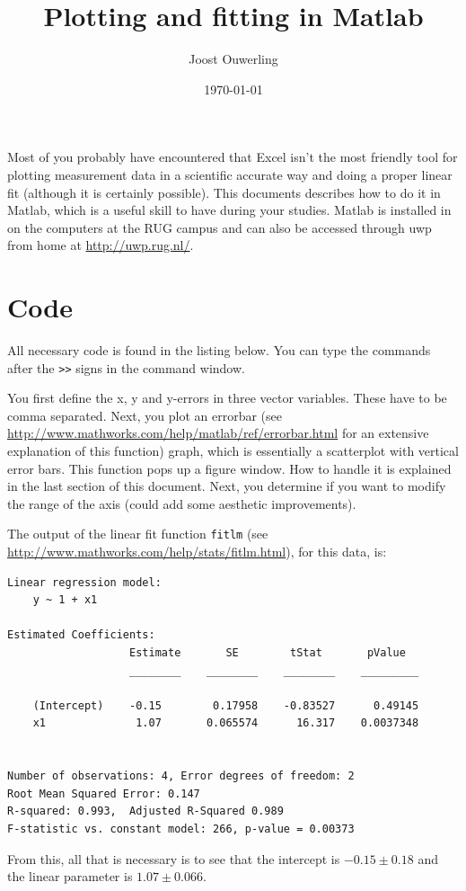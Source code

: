 \documentclass[a4paper]{article}
\title{Plotting and fitting in Matlab}
\author{Joost Ouwerling}
\date{\today}
\begin{document}
\maketitle

Most of you probably have encountered that Excel isn't the most friendly tool for plotting measurement data in a scientific accurate way and doing a proper linear fit (although it is certainly possible). This documents describes how to do it in Matlab, which is a useful skill to have during your studies. Matlab is installed in on the computers at the RUG campus and can also be accessed through uwp from home at \url{http://uwp.rug.nl/}. 


\section*{Code}

All necessary code is found in the listing below. You can type the commands after the \texttt{>>} signs in the command window.

You first define the x, y and y-errors in three vector variables. These have to be comma separated. Next, you plot an errorbar (see \url{http://www.mathworks.com/help/matlab/ref/errorbar.html} for an extensive explanation of this function) graph, which is essentially a scatterplot with vertical error bars. This function pops up a figure window. How to handle it is explained in the last section of this document. Next, you determine if you want to modify the range of the axis (could add some aesthetic improvements). 

\clearpage
The output of the linear fit function \texttt{fitlm} (see \url{http://www.mathworks.com/help/stats/fitlm.html}), for this data, is:
\begin{verbatim}
Linear regression model:
    y ~ 1 + x1

Estimated Coefficients:
                   Estimate       SE        tStat       pValue  
                   ________    ________    ________    _________

    (Intercept)    -0.15        0.17958    -0.83527      0.49145
    x1              1.07       0.065574      16.317    0.0037348


Number of observations: 4, Error degrees of freedom: 2
Root Mean Squared Error: 0.147
R-squared: 0.993,  Adjusted R-Squared 0.989
F-statistic vs. constant model: 266, p-value = 0.00373
\end{verbatim}
From this, all that is necessary is to see that the intercept is $-0.15 \pm 0.18$ and the linear parameter is $1.07 \pm 0.066$.
\end{document}
